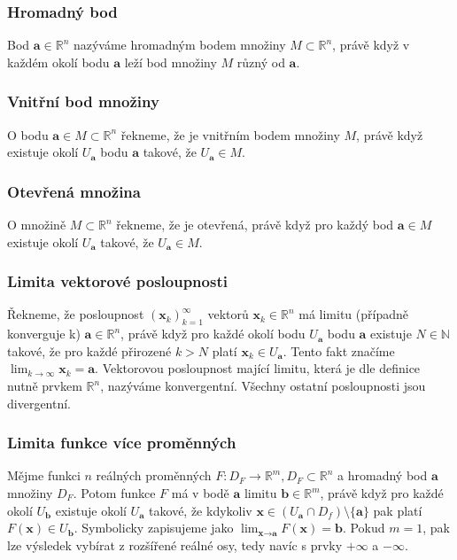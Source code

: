 \subsubsection*{Hromadný bod}
Bod $\textbf{a} \in \mathbb{R}^n$ nazýváme hromadným bodem množiny $M \subset \mathbb{R}^n$, právě když v každém okolí bodu $\textbf{a}$ leží bod množiny $M$ různý od $\textbf{a}$.

\subsubsection*{Vnitřní bod množiny}
O bodu $\textbf{a} \in M \subset \mathbb{R}^n$ řekneme, že je vnitřním bodem množiny $M$, právě když existuje okolí $U_\textbf{a}$ bodu $\textbf{a}$ takové, že $U_\textbf{a} \in M$. 

\subsubsection*{Otevřená množina}
O množině $M \subset \mathbb{R}^n$ řekneme, že je otevřená, právě když pro každý bod $\textbf{a} \in M$ existuje okolí $U_\textbf{a}$ takové, že $U_\textbf{a} \in M$. 

\subsubsection*{Limita vektorové posloupnosti}
Řekneme, že posloupnost $(\textbf{x}_k)_{k=1}^\infty$ vektorů $\textbf{x}_k \in \mathbb{R}^n$ má limitu (případně konverguje k) $\textbf{a} \in \mathbb{R}^n$, právě když pro každé okolí bodu $U_\textbf{a}$ bodu $\textbf{a}$ existuje $N \in \mathbb{N}$ takové, že pro každé přirozené $k > N$ platí $\textbf{x}_k \in U_\textbf{a}$. Tento fakt značíme $\lim_{k\to\infty} \textbf{x}_k = \textbf{a}$. Vektorovou posloupnost mající limitu, která je dle definice nutně prvkem $\mathbb{R}^n$, nazýváme konvergentní. Všechny ostatní posloupnosti jsou divergentní.

\subsubsection*{Limita funkce více proměnných}
Mějme funkci $n$ reálných proměnných $F: D_F \rightarrow \mathbb{R}^m, D_F \subset \mathbb{R}^n$ a hromadný bod $\textbf{a}$ množiny $D_F$. Potom funkce $F$ má v bodě $\textbf{a}$ limitu $\textbf{b} \in \mathbb{R}^m$, právě když pro každé okolí $U_\textbf{b}$ existuje okolí $U_\textbf{a}$ takové, že kdykoliv $\textbf{x} \in (U_\textbf{a} \cap D_f) \setminus \{\textbf{a}\}$ pak platí $F(\textbf{x}) \in U_\textbf{b}$.
Symbolicky zapisujeme jako $\lim_{\textbf{x} \to \textbf{a}} F(\textbf{x}) = \textbf{b}$.
Pokud $m = 1$, pak lze výsledek vybírat z rozšířené reálné osy, tedy navíc s prvky $+\infty$ a $-\infty$.


